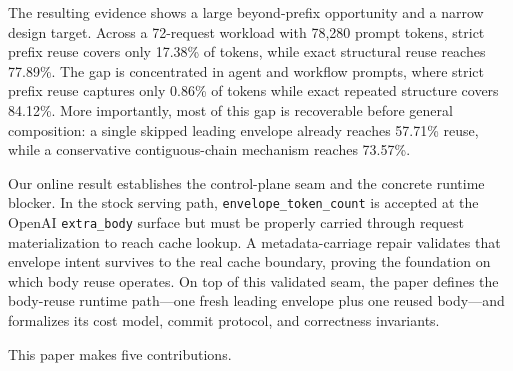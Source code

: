 \documentclass[conference]{IEEEtran}
\begin{document}
The resulting evidence shows a large beyond-prefix opportunity and a narrow design target. Across a 72-request workload with 78{,}280 prompt tokens, strict prefix reuse covers only 17.38\% of tokens, while exact structural reuse reaches 77.89\%. The gap is concentrated in agent and workflow prompts, where strict prefix reuse captures only 0.86\% of tokens while exact repeated structure covers 84.12\%. More importantly, most of this gap is recoverable before general composition: a single skipped leading envelope already reaches 57.71\% reuse, while a conservative contiguous-chain mechanism reaches 73.57\%.

Our online result establishes the control-plane seam and the concrete runtime blocker. In the stock serving path, \texttt{envelope\_token\_count} is accepted at the OpenAI \texttt{extra\_body} surface but must be properly carried through request materialization to reach cache lookup. A metadata-carriage repair validates that envelope intent survives to the real cache boundary, proving the foundation on which body reuse operates. On top of this validated seam, the paper defines the body-reuse runtime path---one fresh leading envelope plus one reused body---and formalizes its cost model, commit protocol, and correctness invariants.

This paper makes five contributions.
\end{document}
